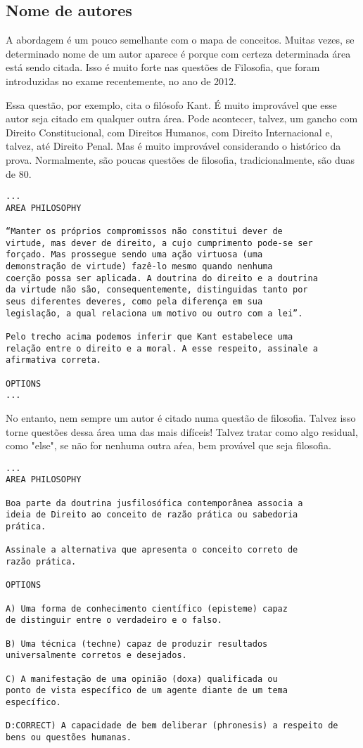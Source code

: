 \documentclass{article}
\begin{document}
\subsection{Nome de autores}

A abordagem é um pouco semelhante com o mapa de conceitos. Muitas
vezes, se determinado nome de um autor aparece é porque com certeza
determinada área está sendo citada. Isso é muito forte nas questões de
Filosofia, que foram introduzidas no exame recentemente, no ano de
2012.

Essa questão, por exemplo, cita o filósofo Kant. É muito improvável
que esse autor seja citado em qualquer outra área. Pode acontecer,
talvez, um gancho com Direito Constitucional, com Direitos Humanos,
com Direito Internacional e, talvez, até Direito Penal. Mas é muito
improvável considerando o histórico da prova. Normalmente, são poucas
questões de filosofia, tradicionalmente, são duas de 80.

\begin{verbatim}
...
AREA PHILOSOPHY

“Manter os próprios compromissos não constitui dever de 
virtude, mas dever de direito, a cujo cumprimento pode-se ser 
forçado. Mas prossegue sendo uma ação virtuosa (uma 
demonstração de virtude) fazê-lo mesmo quando nenhuma 
coerção possa ser aplicada. A doutrina do direito e a doutrina 
da virtude não são, consequentemente, distinguidas tanto por 
seus diferentes deveres, como pela diferença em sua 
legislação, a qual relaciona um motivo ou outro com a lei”. 
 
Pelo trecho acima podemos inferir que Kant estabelece uma 
relação entre o direito e a moral. A esse respeito, assinale a 
afirmativa correta.  
 
OPTIONS
...
\end{verbatim}

No entanto, nem sempre um autor é citado numa questão de
filosofia. Talvez isso torne questões dessa área uma das mais
difíceis! Talvez tratar como algo residual, como "else", se não for
nenhuma outra aŕea, bem provável que seja filosofia.

\begin{verbatim}
...
AREA PHILOSOPHY
 
Boa parte da doutrina jusfilosófica contemporânea associa a 
ideia de Direito ao conceito de razão prática ou sabedoria 
prática.  
 
Assinale a alternativa que apresenta o conceito correto de 
razão prática. 
 
OPTIONS

A) Uma forma de conhecimento científico (episteme) capaz 
de distinguir entre o verdadeiro e o falso. 

B) Uma técnica (techne) capaz de produzir resultados 
universalmente corretos e desejados. 

C) A manifestação de uma opinião (doxa) qualificada ou 
ponto de vista específico de um agente diante de um tema 
específico. 

D:CORRECT) A capacidade de bem deliberar (phronesis) a respeito de 
bens ou questões humanas. 
\end{verbatim}
\end{document}
